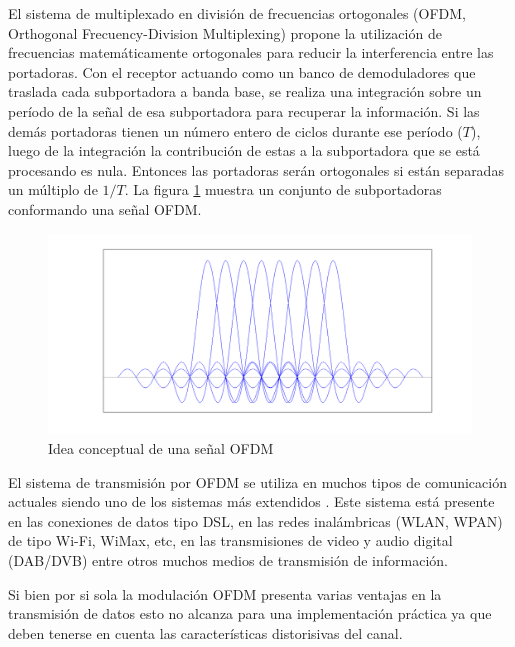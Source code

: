 El sistema de multiplexado en división de frecuencias ortogonales (OFDM, 
Orthogonal Frecuency-Division Multiplexing) propone la utilización de
frecuencias  matemáticamente ortogonales para reducir la interferencia entre las
portadoras. Con el receptor actuando como un banco de demoduladores
que traslada cada subportadora a banda base, se realiza una integración sobre un
período de la señal de esa subportadora para recuperar la información. Si las demás
portadoras tienen un número entero de ciclos durante ese período ($T$), luego de la
integración la contribución de estas a la subportadora que se está procesando es nula. Entonces las
portadoras serán ortogonales si están separadas un múltiplo de $1/T$. La figura \ref{fig:OFDM_ports} 
muestra un conjunto de subportadoras conformando una señal OFDM.

\begin{figure}[htb!]
        \centering
        \includegraphics[width=17cm]{./figures/ofdm_subcarriers.png}
        \caption{Idea conceptual de una señal OFDM}
        \label{fig:OFDM_ports}
\end{figure}

El sistema de transmisión por OFDM se utiliza en muchos tipos de
comunicación actuales siendo uno de los sistemas más extendidos \cite{Prasad2_1}. Este sistema
está presente en las conexiones de datos tipo DSL, en las redes inalámbricas
(WLAN, WPAN) de tipo Wi-Fi, WiMax, etc, en las transmisiones de video y audio
digital (DAB/DVB) entre otros muchos medios de transmisión de información.

Si bien por si sola la modulación OFDM presenta varias ventajas en la
transmisión de datos esto no alcanza para una implementación práctica ya que
deben tenerse en cuenta las características distorisivas del canal.

